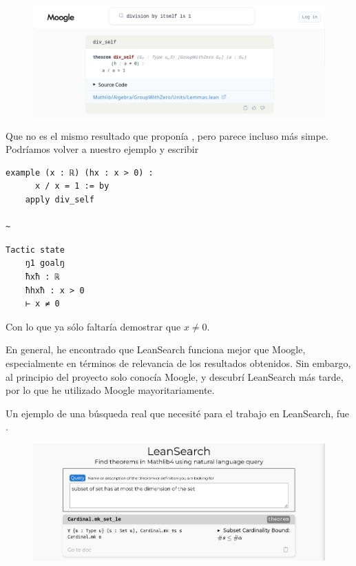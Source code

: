 \begin{figure}[h]
  \centering
  \includegraphics[width=1\textwidth]{figuras/moogle-example.png}
\end{figure}

Que no es el mismo resultado que proponía , pero parece incluso más simpe. Podríamos volver a nuestro ejemplo y escribir

\begin{minipage}[t]{0.58\textwidth}
\begin{lstlisting}[language=lean]
  example (x : ℝ) (hx : x > 0) :
      x / x = 1 := by
    apply div_self

~
\end{lstlisting}
\end{minipage}%
\hfill
\begin{minipage}[t]{0.40\textwidth}
\begin{lstlisting}[language=infoview]
  Tactic state
    ŋ1 goalŋ
    ħxħ : ℝ
    ħhxħ : x > 0
    ⊢ x ≠ 0
\end{lstlisting}
\end{minipage}

Con lo que ya sólo faltaría demostrar que $x \neq 0$.

En general, he encontrado que LeanSearch funciona mejor que Moogle, especialmente en términos de relevancia de los resultados obtenidos. Sin embargo, al principio del proyecto solo conocía Moogle, y descubrí LeanSearch más tarde, por lo que he utilizado Moogle mayoritariamente.

Un ejemplo de una búsqueda real que necesité para el trabajo en LeanSearch, fue \textit{}.

\begin{figure}[h]
  \centering
  \includegraphics[width=1\textwidth]{figuras/leansearch-example-cropped.png}
\end{figure}

